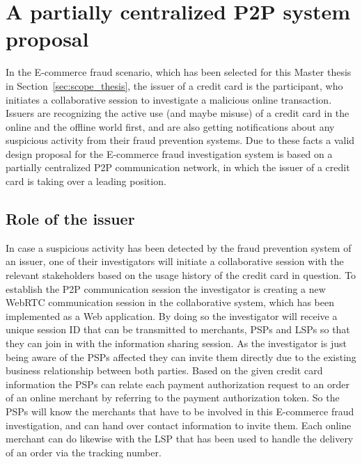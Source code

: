 
\section{A partially centralized \gls{P2P} system proposal}
\label{sec:p2p_partially_centralized_system}

In the \gls{E-commerce} fraud scenario, which has been selected for this Master thesis in Section~\ref{sec:scope_thesis}, the issuer of a credit card is the participant, who initiates a collaborative session to investigate a malicious online transaction. Issuers are recognizing the active use (and maybe misuse) of a credit card in the online and the offline world first, and are also getting notifications about any suspicious activity from their fraud prevention systems. Due to these facts a valid design proposal for the \gls{E-commerce} fraud investigation system is based on a partially centralized \gls{P2P} communication network, in which the issuer of a credit card is taking over a leading position.

\subsection{Role of the issuer}
\label{subsec:p2p_partially_issuer_collecting}

In case a suspicious activity has been detected by the fraud prevention system of an issuer, one of their investigators will initiate a collaborative session with the relevant stakeholders based on the usage history of the credit card in question. To establish the \gls{P2P} communication session the investigator is creating a new \gls{WebRTC} communication session in the collaborative system, which has been implemented as a Web application. By doing so the investigator will receive a unique session ID that can be transmitted to merchants, \gls{PSP}s and \gls{LSP}s so that they can join in with the information sharing session. As the investigator is just being aware of the \gls{PSP}s affected they can invite them directly due to the existing business relationship between both parties. Based on the given credit card information the \gls{PSP}s can relate each payment authorization request to an order of an online merchant by referring to the payment authorization token. So the \gls{PSP}s will know the merchants that have to be involved in this \gls{E-commerce} fraud investigation, and can hand over contact information to invite them. Each online merchant can do likewise with the \gls{LSP} that has been used to handle the delivery of an order via the tracking number. \\

